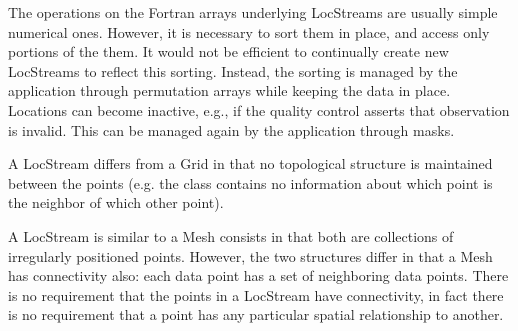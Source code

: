 The operations on the Fortran arrays underlying LocStreams are usually simple numerical ones. However,
it is necessary to sort them in place, and access only portions of the them. It would
not be efficient to continually create new LocStreams to reflect this sorting. Instead,
the sorting is managed by the application through permutation arrays while keeping
the data in place. Locations can become inactive, e.g., if the quality control asserts that
observation is invalid. This can be managed again by the application through masks.

A LocStream differs from a Grid in that no topological structure is
maintained between the points
(e.g. the class contains no information about which point is the neighbor
of which other point).

A LocStream is similar to a Mesh consists in that both are collections of irregularly positioned 
points.  However, the two structures differ in that a Mesh has connectivity
also: each data point has a set of neighboring data points. There is no requirement that the
points in a LocStream have connectivity, in fact there is no requirement that a point has 
any particular spatial relationship to another.
